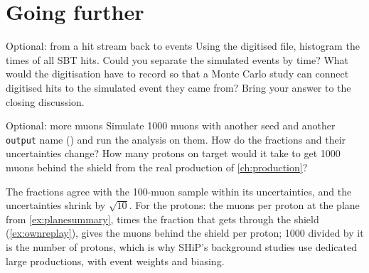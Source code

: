 \section{Going further}

\begin{exercise}[colback=white]{Optional: from a hit stream back to events}
Using the digitised file, histogram the times of all SBT hits. Could you
separate the simulated events by time? What would the digitisation have to
record so that a Monte Carlo study can connect digitised hits to the
simulated event they came from? Bring your answer to the closing discussion.
\end{exercise}

\begin{exercise}[colback=white]{Optional: more muons}
Simulate 1000 muons with another seed and another \texttt{output} name
() and run the analysis on
them. How do the fractions and their uncertainties change? How many protons
on target would it take to get 1000 muons behind the shield from the real
production of \cref{ch:production}?
\end{exercise}

\begin{solution}
The fractions agree with the 100-muon sample within its uncertainties, and
the uncertainties shrink by $\sqrt{10}$. For the protons: the muons per proton
at the plane from \cref{ex:planesummary}, times the fraction that gets
through the shield (\cref{ex:ownreplay}), gives the muons behind the shield
per proton; 1000 divided by it is the number of protons, which is why SHiP's
background studies use dedicated large productions, with event weights and
biasing.
\end{solution}
